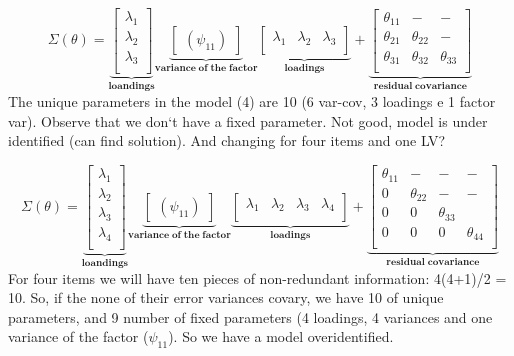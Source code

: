 \documentclass[
]{article}
\begin{document}
\[
\begin{equation}
\tag{4}
\Sigma(\theta)=\underbrace{\begin{bmatrix}
\lambda_{1}     \\
\lambda_{2}     \\
\lambda_{3}     \\
            \end{bmatrix}
 }_{\mathbf{loandings}} \underbrace{\begin{bmatrix}
(\psi_{11})
            \end{bmatrix}
 }_{\mathbf{variance \; of \; the \;factor}} \underbrace{\begin{bmatrix}
\lambda_{1}  & \lambda_{2}  & \lambda_{3}    \\
            \end{bmatrix}
 }_{\mathbf{loadings}} + \underbrace{\begin{bmatrix}
\theta_{11} & - & -   \\
\theta_{21} & \theta_{22} & -       \\
\theta_{31} & \theta_{32} & \theta_{33}    \\
            \end{bmatrix}
            }_{\mathbf{residual \; covariance}}
\end{equation}
\] The unique parameters in the model (4) are 10 (6 var-cov, 3 loadings
e 1 factor var). Observe that we don`t have a fixed parameter. Not good,
model is under identified (can find solution). And changing for four
items and one LV?

\[
\begin{equation}
\tag{8}
\Sigma(\theta)=\underbrace{\begin{bmatrix}
\lambda_{1}     \\
\lambda_{2}     \\
\lambda_{3} \\
\lambda_{4} \\
            \end{bmatrix}
 }_{\mathbf{loandings}} \underbrace{\begin{bmatrix}
(\psi_{11})
            \end{bmatrix}
 }_{\mathbf{variance \; of \; the \;factor}} \underbrace{\begin{bmatrix}
\lambda_{1}  & \lambda_{2}  & \lambda_{3} & \lambda_{4}    \\
            \end{bmatrix}
 }_{\mathbf{loadings}} + \underbrace{\begin{bmatrix}
\theta_{11} & - & - & -   \\
0 & \theta_{22} & - & -       \\
0 & 0 & \theta_{33} &     \\
0 & 0 & 0 & \theta_{44}    \\
            \end{bmatrix}
            }_{\mathbf{residual \; covariance}}
\end{equation}
\] For four items we will have ten pieces of non-redundant information:
4(4+1)/2 = 10. So, if the none of their error variances covary, we have
10 of unique parameters, and 9 number of fixed parameters (4 loadings, 4
variances and one variance of the factor (\(\psi_{11}\)). So we have a
model overidentified.
\end{document}

